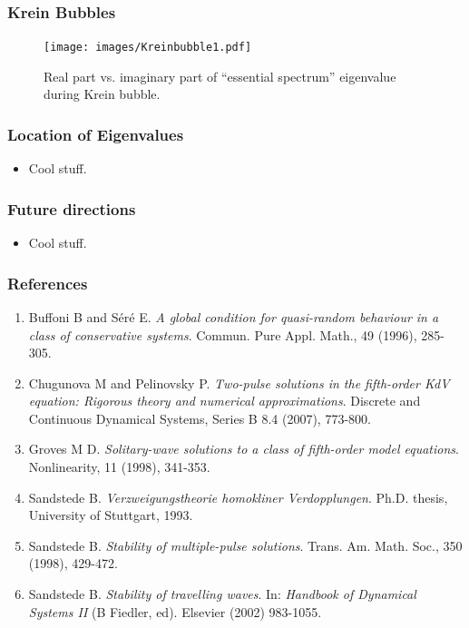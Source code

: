 \documentclass[16pt]{beamer}
\begin{document}
\begin{frame}
	\frametitle{Krein Bubbles}
	\fontsize{16}{7.2}\selectfont
		\begin{figure}
		\begin{center}
		\texttt{[image: images/Kreinbubble1.pdf]}
		\end{center}
		\caption{Real part vs. imaginary part of ``essential spectrum'' eigenvalue during Krein bubble.}
		\end{figure}
\end{frame}

\begin{frame}
	\frametitle{Location of Eigenvalues}
	\fontsize{16}{7.2}\selectfont
	\begin{itemize}
		\item Cool stuff.
	\end{itemize}
\end{frame}

\begin{frame}
	\frametitle{Future directions}
	\fontsize{16}{7.2}\selectfont
	\begin{itemize}
		\item Cool stuff.
	\end{itemize}
\end{frame}

\begin{frame}
	\frametitle{References}
	\fontsize{12}{7.2}\selectfont
	\begin{enumerate}
		\item Buffoni B and S\'er\'e E. \emph{A global condition for quasi-random behaviour in a class of conservative systems}. Commun. Pure Appl. Math., 49 (1996), 285-305.
		\item Chugunova M and Pelinovsky P. \emph{Two-pulse solutions in the fifth-order KdV equation: Rigorous theory and numerical approximations}. Discrete and Continuous Dynamical Systems, Series B 8.4 (2007), 773-800.
		\item Groves M D. \emph{Solitary-wave solutions to a class of fifth-order model equations}. Nonlinearity, 11 (1998), 341-353.
		\item Sandstede B. \emph{Verzweigungstheorie homokliner Verdopplungen}. Ph.D. thesis, University of Stuttgart, 1993.
		\item Sandstede B. \emph{Stability of multiple-pulse solutions}. Trans. Am. Math. Soc., 350 (1998), 429-472.
		\item Sandstede B. \emph{Stability of travelling waves}. In: \emph{Handbook of Dynamical Systems II} (B Fiedler, ed). Elsevier (2002) 983-1055.
	\end{enumerate}
\end{frame}
 
\end{document}
